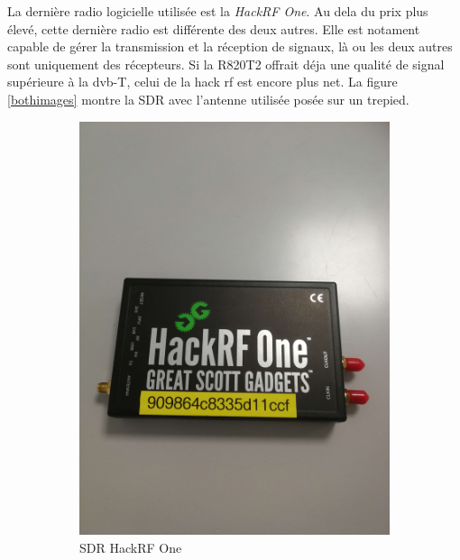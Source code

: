 La dernière radio logicielle utilisée est la \textit{HackRF One}. Au dela du prix plus élevé, cette dernière radio est différente des deux autres. Elle est notament capable de gérer la transmission et la réception de signaux, là ou les deux autres sont uniquement des récepteurs. Si la R820T2 offrait déja une qualité de signal supérieure à la dvb-T, celui de la hack rf est encore plus net. La figure \ref{bothimages} montre la SDR avec l'antenne utilisée posée sur un trepied.

\begin{figure}[h]
\centering
\begin{subfigure}{0.4\textwidth}
  \centering
  \includegraphics[width=\textwidth]{images/hackrf.png}
  \caption{SDR HackRF One}
  \label{term330}
\end{subfigure}
\hspace{0.5cm} %
\begin{subfigure}{0.4\textwidth}

\end{subfigure}
\end{figure}
